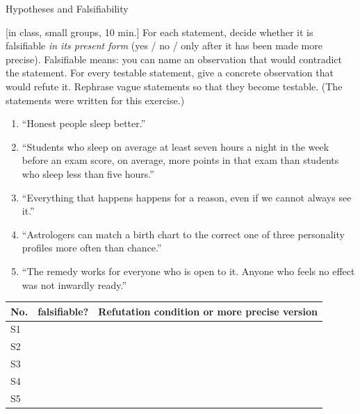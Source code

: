 \begin{uebungsblatt}{Hypotheses and Falsifiability}

[in class, small groups, 10 min.]
For each statement, decide whether it is falsifiable \emph{in its present
form} (yes / no / only after it has been made more precise). Falsifiable
means: you can name an observation that would contradict the statement.
For every testable statement, give a concrete observation that would
refute it. Rephrase vague statements so that they become testable. (The
statements were written for this exercise.)

\begin{enumerate}
  \item[S1] \enquote{Honest people sleep better.}
  \item[S2] \enquote{Students who sleep on average at least seven hours a
    night in the week before an exam score, on average, more points in
    that exam than students who sleep less than five hours.}
  \item[S3] \enquote{Everything that happens happens for a reason, even if
    we cannot always see it.}
  \item[S4] \enquote{Astrologers can match a birth chart to the correct
    one of three personality profiles more often than chance.}
  \item[S5] \enquote{The remedy works for everyone who is open to it.
    Anyone who feels no effect was not inwardly ready.}
\end{enumerate}

\begin{center}
\renewcommand{\arraystretch}{2.4}
\begin{tabular}{|p{}|p{}|p{}|}
\hline
\textbf{No.} & \textbf{falsifiable?} & \textbf{Refutation condition or more precise version} \\
\hline
S1 & & \\ \hline
S2 & & \\ \hline
S3 & & \\ \hline
S4 & & \\ \hline
S5 & & \\ \hline
\end{tabular}
\end{center}
\end{uebungsblatt}

